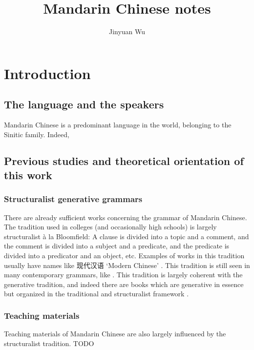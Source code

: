 \documentclass[UTF8, a4paper, oneside, scheme=plain]{ctexrep}
\title{Mandarin Chinese notes}
\author{Jinyuan Wu}
\newcommand{\ala}{à la}
\newcommand{\translate}[1]{`#1'}
\begin{document}
\maketitle

\automath

\chapter{Introduction}

\section{The language and the speakers}

Mandarin Chinese is a predominant language in the world,
belonging to the Sinitic family.
Indeed,  

\section{Previous studies and theoretical orientation of this work}

\subsection{Structuralist generative grammars}\label{sec:previous.structuralist}

There are already sufficient works concerning the grammar of Mandarin Chinese.
The tradition used in colleges (and occasionally high schools) 
is largely structuralist \ala{} Bloomfield:
A clause is divided into a topic and a comment,
and the comment is divided into a subject and a predicate,
and the predicate is divided into a predicator and an object, etc.
Examples of works in this tradition usually have names like 现代汉语 \translate{Modern Chinese}
\citep{xianhan2004}.
This tradition is still seen in many contemporary grammars,
like \citet{cgel}.
This tradition is largely coherent with the generative tradition,
and indeed there are books which are generative in essence 
but organized in the traditional and structuralist framework \citep{deng2010formal}.

\subsection{Teaching materials}

Teaching materials of Mandarin Chinese are also largely influenced by the structuralist tradition.
TODO
\end{document}
